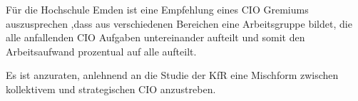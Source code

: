 Für die Hochschule Emden ist eine Empfehlung eines CIO Gremiums auszusprechen ,dass aus verschiedenen Bereichen eine Arbeitsgruppe bildet, die alle anfallenden CIO Aufgaben untereinander aufteilt und somit den Arbeitsaufwand prozentual auf alle aufteilt. 

Es ist anzuraten, anlehnend an die Studie der KfR eine Mischform zwischen kollektivem und strategischen CIO anzustreben.
